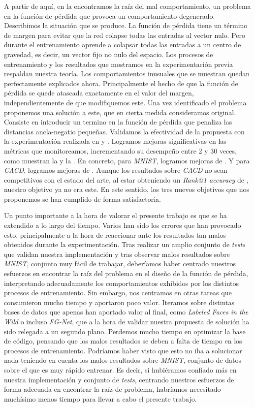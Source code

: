 A partir de aquí, en la \sectionref{} encontramos la raíz del mal comportamiento, un problema en la función de pérdida que provoca un comportamiento degenerado. Describimos la situación que se produce. La función de pérdida tiene un término de margen para evitar que la red colapse todas las entradas al vector nulo. Pero durante el entrenamiento aprende a colapsar todas las entradas a un centro de gravedad, es decir, un vector fijo no nulo del espacio. Los procesos de entrenamiento y los resultados que mostramos en la experimentación previa respaldan nuestra teoría. Los comportamientos inusuales que se muestran quedan perfectamente explicados ahora. Principalmente el hecho de que la función de pérdida se quede atascada exactamente en el valor del margen, independientemente de que modifiquemos este. Una vez identificado el problema proponemos una solución a este, que en cierta medida consideramos original. Consiste en introducir un termino en la función de pérdida que penaliza las distancias ancla-negatio pequeñas. Validamos la efectividad de la propuesta con la experimentación realizada en \sectionref{} y \sectionref{}. Logramos mejoras significativas en las métricas que monitoreamos, incrementando su desempeño entre 2 y 30 veces, como muestran la \tableref{} y la \tableref{}. En concreto, para \textit{MNIST}, logramos mejoras de . Y para \textit{CACD}, logramos mejoras de . Aunque los resultados sobre \textit{CACD} no sean competitivos con el estado del arte, al estar obteniendo un \textit{Rank@1 accuracy} de , nuestro objetivo ya no era este. En este sentido, los tres nuevos objetivos que nos proponemos se han cumplido de forma satisfactoria.

Un punto importante a la hora de valorar el presente trabajo es que se ha extendido a lo largo del tiempo. Varios han sido los errores que han provocado esto, principalmente a la hora de reaccionar ante los resultados tan malos obtenidos durante la experimentación. Tras realizar un amplio conjunto de \textit{tests} que validan nuestra implementación y tras observar malos resultados sobre \textit{MNIST}, conjunto muy fácil de trabajar, deberíamos haber centrado nuestros esfuerzos en encontrar la raíz del problema en el diseño de la función de pérdida, interpretando adecuadamente los comportamientos exhibidos por los distintos procesos de entrenamiento. Sin embargo, nos centramos en otras tareas que consumieron mucho tiempo y aportaron poco valor. Iteramos sobre distintas bases de datos que apenas han aportado valor al final, como \textit{Labeled Faces in the Wild} o incluso \textit{FG-Net}, que a la hora de validar nuestra propuesta de solución ha sido relegada a un segundo plano. Perdemos mucho tiempo en optimizar la base de código, pensando que los malos resultados se deben a falta de tiempo en los procesos de entrenamiento. Podríamos haber visto que esto no iba a solucionar nada teniendo en cuenta los malos resultados sobre \textit{MNIST}, conjunto de datos sobre el que es muy rápido entrenar. Es decir, si hubiéramos confiado más en nuestra implementación y conjunto de \textit{tests}, centrando nuestros esfuerzos de forma adecuada en encontrar la raíz de problema, habríamos necesitado muchísimo menos tiempo para llevar a cabo el presente trabajo.

